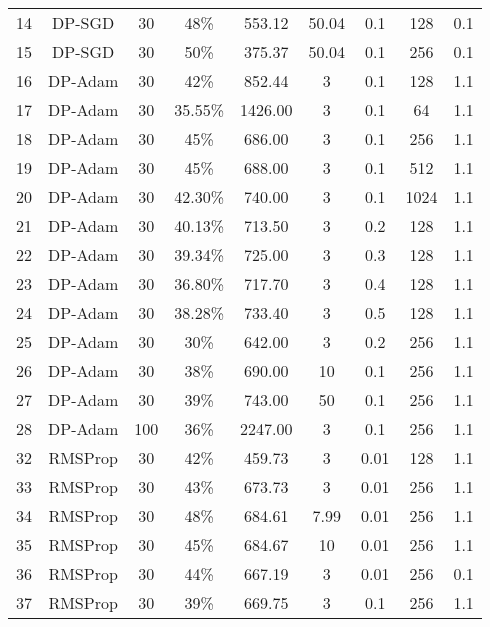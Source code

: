 \documentclass{article}
\begin{document}
\begin{table}[!ht]
{\begin{tabular}{|c|c|c|c|c|c|c|c|c|}
                14 & DP-SGD   & 30  & 48\%    & 553.12  & 50.04  & 0.1  & 128  & 0.1 \\
                15 & DP-SGD   & 30  & 50\%    & 375.37  & 50.04  & 0.1  & 256  & 0.1 \\
                16 & DP-Adam  & 30  & 42\%    & 852.44  & 3      & 0.1  & 128  & 1.1 \\
                17 & DP-Adam  & 30  & 35.55\% & 1426.00 & 3      & 0.1  & 64   & 1.1 \\
                18 & DP-Adam  & 30  & 45\%    & 686.00  & 3      & 0.1  & 256  & 1.1 \\
                19 & DP-Adam  & 30  & 45\%    & 688.00  & 3      & 0.1  & 512  & 1.1 \\
                20 & DP-Adam  & 30  & 42.30\% & 740.00  & 3      & 0.1  & 1024 & 1.1 \\
                21 & DP-Adam  & 30  & 40.13\% & 713.50  & 3      & 0.2  & 128  & 1.1 \\
                22 & DP-Adam  & 30  & 39.34\% & 725.00  & 3      & 0.3  & 128  & 1.1 \\
                23 & DP-Adam  & 30  & 36.80\% & 717.70  & 3      & 0.4  & 128  & 1.1 \\
                24 & DP-Adam  & 30  & 38.28\% & 733.40  & 3      & 0.5  & 128  & 1.1 \\
                25 & DP-Adam  & 30  & 30\%    & 642.00  & 3      & 0.2  & 256  & 1.1 \\
                26 & DP-Adam  & 30  & 38\%    & 690.00  & 10     & 0.1  & 256  & 1.1 \\
                27 & DP-Adam  & 30  & 39\%    & 743.00  & 50     & 0.1  & 256  & 1.1 \\
                28 & DP-Adam  & 100 & 36\%    & 2247.00 & 3      & 0.1  & 256  & 1.1 \\
                32 & RMSProp  & 30  & 42\%    & 459.73  & 3      & 0.01 & 128  & 1.1 \\
                33 & RMSProp  & 30  & 43\%    & 673.73  & 3      & 0.01 & 256  & 1.1 \\
                34 & RMSProp  & 30  & 48\%    & 684.61  & 7.99   & 0.01 & 256  & 1.1 \\
                35 & RMSProp  & 30  & 45\%    & 684.67  & 10     & 0.01 & 256  & 1.1 \\
                36 & RMSProp  & 30  & 44\%    & 667.19  & 3      & 0.01 & 256  & 0.1 \\
                37 & RMSProp  & 30  & 39\%    & 669.75  & 3      & 0.1  & 256  & 1.1 \\

\end{tabular}}
\end{table}
\end{document}
